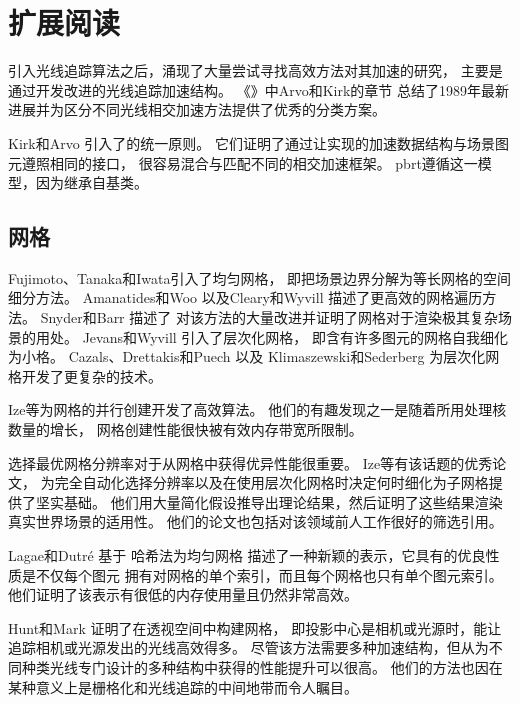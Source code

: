 \section{扩展阅读}\label{sec:扩展阅读04}
引入光线追踪算法之后，涌现了大量尝试寻找高效方法对其加速的研究，
主要是通过开发改进的光线追踪加速结构。
《》\citep{10.5555/94788}中Arvo和Kirk的章节
总结了1989年最新进展并为区分不同光线相交加速方法提供了优秀的分类方案。

Kirk和Arvo \parencite*{Kirk88theray}引入了的统一原则。
它们证明了通过让实现的加速数据结构与场景图元遵照相同的接口，
很容易混合与匹配不同的相交加速框架。
pbrt遵循这一模型，因为继承自基类。

\subsection{网格}\label{sub:网格}
Fujimoto、Tanaka和Iwata\parencite*{4056861}引入了均匀网格，
即把场景边界分解为等长网格的空间细分方法。
Amanatides和Woo \parencite*{10.2312:egtp.19871000}
以及Cleary和Wyvill \parencite*{Cleary1988}描述了更高效的网格遍历方法。
Snyder和Barr \parencite*{10.1145/37401.37417}描述了
对该方法的大量改进并证明了网格对于渲染极其复杂场景的用处。
Jevans和Wyvill \parencite*{Jevans1989:23}引入了层次化网格，
即含有许多图元的网格自我细化为小格。
Cazals、Drettakis和Puech \parencite*{cazals1995filtering}以及
Klimaszewski和Sederberg \parencite*{576857}为层次化网格开发了更复杂的技术。

Ize等\parencite*{4061545}为网格的并行创建开发了高效算法。
他们的有趣发现之一是随着所用处理核数量的增长，
网格创建性能很快被有效内存带宽所限制。

选择最优网格分辨率对于从网格中获得优异性能很重要。
Ize等\parencite*{4342587}有该话题的优秀论文，
为完全自动化选择分辨率以及在使用层次化网格时决定何时细化为子网格提供了坚实基础。
他们用大量简化假设推导出理论结果，然后证明了这些结果渲染真实世界场景的适用性。
他们的论文也包括对该领域前人工作很好的筛选引用。

Lagae和Dutré \parencite*{lagae2008compact}基于
哈希法为均匀网格
描述了一种新颖的表示，它具有的优良性质是不仅每个图元
拥有对网格的单个索引，而且每个网格也只有单个图元索引。
他们证明了该表示有很低的内存使用量且仍然非常高效。

Hunt和Mark \parencite*{4634613}证明了在透视空间中构建网格，
即投影中心是相机或光源时，能让追踪相机或光源发出的光线高效得多。
尽管该方法需要多种加速结构，但从为不同种类光线专门设计的多种结构中获得的性能提升可以很高。
他们的方法也因在某种意义上是栅格化和光线追踪的中间地带而令人瞩目。

